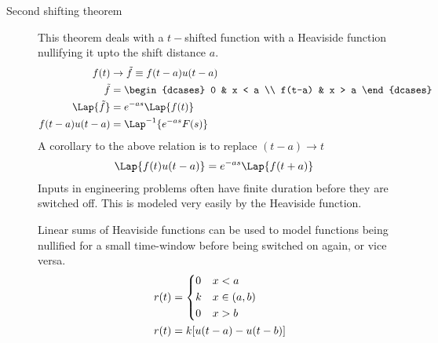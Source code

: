 \begin{description}
    \item[Second shifting theorem] This theorem deals with a $ t-$shifted function with
        a Heaviside function nullifying it upto the shift distance $ a $.
        \begin{align}
            f(t)              & \to \tilde{f} \equiv f(t-a)u(t-a) \\
            \tilde{f}         & = \begin{dcases}
                                      0      & x < a \\
                                      f(t-a) & x > a
                                  \end{dcases}                  \\
            \Lap\{\tilde{f}\} & = e^{-as}\Lap\{f(t)\}             \\
            f(t-a)u(t-a)      & = \Lap^{-1}\{e^{-as}F(s)\}
        \end{align}
        A corollary to the above relation is to replace $ (t-a) \to t $
        \begin{align}
            \Lap\{f(t)u(t-a)\} & = e^{-as}\Lap\{f(t+a)\}
        \end{align}
        Inputs in engineering problems often have finite duration before they are
        switched off. This is modeled very easily by the Heaviside function. \par
        Linear sums of Heaviside functions can be used to model functions being
        nullified for a small time-window before being switched on again, or vice
        versa.
        \begin{align}
            r(t) & = \begin{dcases}
                         0 & x < a       \\
                         k & x \in (a,b) \\
                         0 & x > b
                     \end{dcases}    \\
            r(t) & = k[u(t-a) - u(t-b)]
        \end{align}
\end{description}


